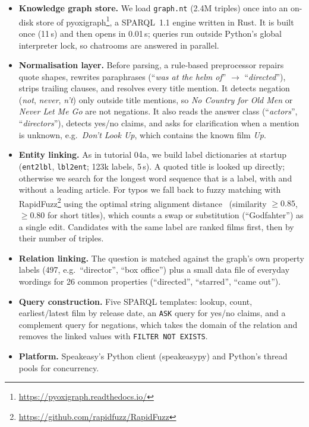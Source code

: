 \documentclass{article}
\begin{document}
\begin{itemize}
    \item \textbf{Knowledge graph store.} We load \texttt{graph.nt} (2.4M triples) once into an on-disk store of pyoxigraph\footnote{\url{https://pyoxigraph.readthedocs.io/}}, a SPARQL~1.1 engine written in Rust. It is built once (11\,s) and then opens in 0.01\,s; queries run outside Python's global interpreter lock, so chatrooms are answered in parallel.
    \item \textbf{Normalisation layer.} Before parsing, a rule-based preprocessor repairs quote shapes, rewrites paraphrases (``\textit{was at the helm of}'' $\rightarrow$ ``\textit{directed}''), strips trailing clauses, and resolves every title mention. It detects negation (\textit{not}, \textit{never}, \textit{n't}) only outside title mentions, so \textit{No Country for Old Men} or \textit{Never Let Me Go} are not negations. It also reads the answer class (``\textit{actors}'', ``\textit{directors}''), detects yes/no claims, and asks for clarification when a mention is unknown, e.g.\ \textit{Don't Look Up}, which contains the known film \textit{Up}.
    \item \textbf{Entity linking.} As in tutorial 04a, we build label dictionaries at startup (\texttt{ent2lbl}, \texttt{lbl2ent}; 123k labels, 5\,s). A quoted title is looked up directly; otherwise we search for the longest word sequence that is a label, with and without a leading article. For typos we fall back to fuzzy matching with RapidFuzz\footnote{\url{https://github.com/rapidfuzz/RapidFuzz}} using the optimal string alignment distance~\cite{damerau1964technique} (similarity $\geq 0.85$, $\geq 0.80$ for short titles), which counts a swap or substitution (``Godfahter'') as a single edit. Candidates with the same label are ranked films first, then by their number of triples.
    \item \textbf{Relation linking.} The question is matched against the graph's own property labels (497, e.g.\ ``director'', ``box office'') plus a small data file of everyday wordings for 26 common properties (``directed'', ``starred'', ``came out'').
    \item \textbf{Query construction.} Five SPARQL templates: lookup, count, earliest/latest film by release date, an \texttt{ASK} query for yes/no claims, and a complement query for negations, which takes the domain of the relation and removes the linked values with \texttt{FILTER NOT EXISTS}.
    \item \textbf{Platform.} Speakeasy's Python client (speakeasypy) and Python's thread pools for concurrency.
\end{itemize}
\end{document}
